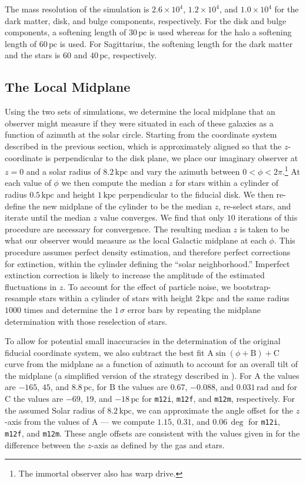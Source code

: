 \documentclass[twocolumn]{aastex62}
\newcommand{\pc}{\text{pc}}
\newcommand{\kpc}{\text{kpc}}
\newcommand{\mi}{\texttt{m12i}}
\newcommand{\mf}{\texttt{m12f}}
\newcommand{\mm}{\texttt{m12m}}
\begin{document}
The mass resolution of the simulation is $2.6\times10^4$, $1.2\times10^4$, and
$1.0\times10^4$ for the dark matter, disk, and bulge components, respectively.
For the disk and bulge components, a softening length of $30\,\pc$ is used
whereas for the halo a softening length of $60\,\pc$ is used. For Sagittarius,
the softening length for the dark matter and the stars is $60$ and $40\,\pc$,
respectively.

\subsection{The Local Midplane} \label{ssec:local_midplane}
Using the two sets of simulations, we determine the local midplane that an
observer might measure if they were situated in each of these galaxies as a
function of azimuth at the solar circle. Starting from the coordinate system
described in the previous section, which is approximately aligned so that the
$z$-coordinate is perpendicular to the disk plane, we place our imaginary
observer at $z=0$ and a solar radius of $8.2\,\kpc$ and vary the azimuth
between $0<\phi<2\pi$.\footnote{The immortal observer also has warp drive.} At
each value of $\phi$ we then compute the median $z$ for stars within a
cylinder of radius $0.5\,\kpc$ and height $1\,\kpc$ perpendicular to the
fiducial disk. We then re-define the new midplane of the cylinder to be the
median $z$, re-select stars, and iterate until the median $z$ value converges.
We find that only $10$ iterations of this procedure are necessary for
convergence. The resulting median $z$ is taken to be what our observer would
measure as the local Galactic midplane at each $\phi$. This procedure assumes
perfect density estimation, and therefore perfect corrections for extinction,
within the cylinder defining the ``solar neighborhood.'' Imperfect extinction
correction is likely to increase the amplitude of the estimated fluctuations
in $z$. To account for the effect of particle noise, we bootstrap-resample
stars within a cylinder of stars with height $2\,\kpc$ and the same radius
$1000$ times and determine the $1\,\sigma$ error bars by repeating the
midplane determination with those reselection of stars.

To allow for potential small inaccuracies in the determination of the original
fiducial coordinate system, we also subtract the best fit $\text{A}
\sin{\left(\phi + \text{B}\right)} + \text{C}$ curve from the midplane as a
function of azimuth to account for an overall tilt of the midplane (a
simplified version of the strategy described in
\citealt{2019ApJ...871..145A}). For $\text{A}$ the values are $-165$, $45$,
and $8.8\,\pc$, for $\text{B}$ the values are $0.67$, $-0.088$, and
$0.031\,\text{rad}$ and for $\text{C}$ the values are $-69$, $19$, and
$-18\,\pc$ for \mi{}, \mf{}, and \mm{}, respectively. For the assumed Solar
radius of $8.2\,\kpc$, we can approximate the angle offset for the $z$-axis
from the values of $\text{A}$ --- we compute $1.15$, $0.31$, and $0.06\,\deg$
for \mi{}, \mf{}, and \mm{}. These angle offsets are consistent with the
values given in \citet{2018arXiv180610564S} for the difference between the
$z$-axis as defined by the gas and stars.
\end{document}
